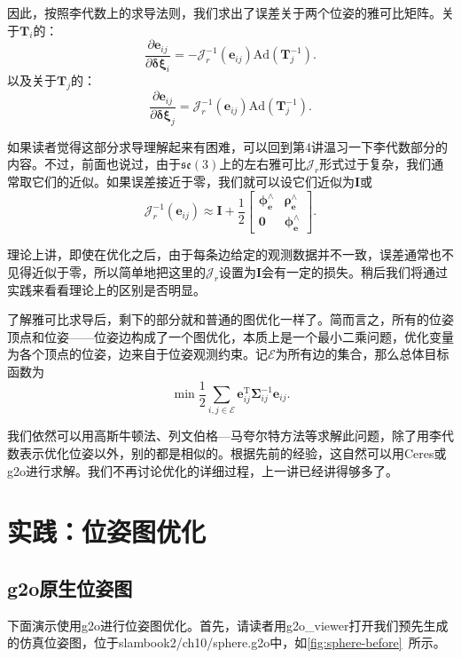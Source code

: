 因此，按照李代数上的求导法则，我们求出了误差关于两个位姿的雅可比矩阵。关于$\bm{T}_i$的：
\begin{equation}
\frac{\partial \bm{e}_{ij}}{\partial \bm{\delta \xi}_i} = - \bm{\mathcal{J}}_r^{-1}(\bm{e}_{ij}) \mathrm{Ad}(\bm{T}_j^{-1}).
\end{equation}
以及关于$\bm{T}_j$的：
\begin{equation}
\frac{\partial \bm{e}_{ij}}{\partial \bm{\delta \xi}_j} = \bm{\mathcal{J}}_r^{-1}(\bm{e}_{ij}) \mathrm{Ad}(\bm{T}_j^{-1}).
\end{equation}

如果读者觉得这部分求导理解起来有困难，可以回到第4讲温习一下李代数部分的内容。不过，前面也说过，由于$\mathfrak{se}(3)$上的左右雅可比$\bm{\mathcal{J}}_r$形式过于复杂，我们通常取它们的近似。如果误差接近于零，我们就可以设它们近似为$\bm{I}$或
\begin{equation}
\bm{\mathcal{J}}_r^{-1}(\bm{e}_{ij}) \approx \bm{I} + \frac{1}{2} 
\left[ 
{\begin{array}{*{20}{c}}
	{{\bm{\phi}_{\bm{e}} ^ \wedge }}&{{\bm{\rho}_{\bm{e}} ^ \wedge }}\\
	{\bm{0}}&{{\bm{\phi}_{\bm{e}} ^ \wedge }}
\end{array}} 
\right].
\end{equation}

理论上讲，即使在优化之后，由于每条边给定的观测数据并不一致，误差通常也不见得近似于零，所以简单地把这里的$\bm{\mathcal{J}}_r$设置为$\bm{I}$会有一定的损失。稍后我们将通过实践来看看理论上的区别是否明显。

了解雅可比求导后，剩下的部分就和普通的图优化一样了。简而言之，所有的位姿顶点和位姿——位姿边构成了一个图优化，本质上是一个最小二乘问题，优化变量为各个顶点的位姿，边来自于位姿观测约束。记$\mathcal{E}$为所有边的集合，那么总体目标函数为
\begin{equation}
\mathop {\min }\limits \frac{1}{2}\sum\limits_{i,j \in \mathcal{E}} \bm{e}_{ij}^\mathrm{T} \bm{\Sigma}_{ij}^{-1} \bm{e}_{ij}.
\end{equation}

我们依然可以用高斯牛顿法、列文伯格—马夸尔特方法等求解此问题，除了用李代数表示优化位姿以外，别的都是相似的。根据先前的经验，这自然可以用Ceres或g2o进行求解。我们不再讨论优化的详细过程，上一讲已经讲得够多了。

\section{实践：位姿图优化}
\subsection{g2o原生位姿图}
下面演示使用g2o进行位姿图优化。首先，请读者用g2o\_viewer打开我们预先生成的仿真位姿图，位于slambook2/ch10/sphere.g2o中，如\autoref{fig:sphere-before}~所示。

